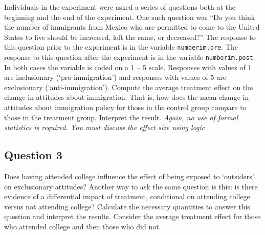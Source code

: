 \documentclass[]{article}
\begin{document}
Individuals in the experiment were asked a series of questions both at
the beginning and the end of the experiment. One such question was ``Do
you think the number of immigrants from Mexico who are permitted to come
to the United States to live should be increased, left the same, or
decreased?'' The response to this question prior to the experiment is in
the variable \texttt{numberim.pre}. The response to this question after
the experiment is in the variable \texttt{numberim.post}. In both cases
the variable is coded on a 1 -- 5 scale. Responses with values of 1 are
inclusionary (`pro-immigration') and responses with values of 5 are
exclusionary (`anti-immigration'). Compute the average treatment effect
on the change in attitudes about immigration. That is, how does the mean
change in attitudes about immigration policy for those in the control
group compare to those in the treatment group. Interpret the result.
\emph{Again, no use of formal statistics is required. You must discuss
the effect size using logic}

\subsection{Question 3}\label{question-3}

Does having attended college influence the effect of being exposed to
`outsiders' on exclusionary attitudes? Another way to ask the same
question is this: is there evidence of a differential impact of
treatment, conditional on attending college versus not attending
college? Calculate the necessary quantities to answer this question and
interpret the results. Consider the average treatment effect for those
who attended college and then those who did not.
\end{document}
